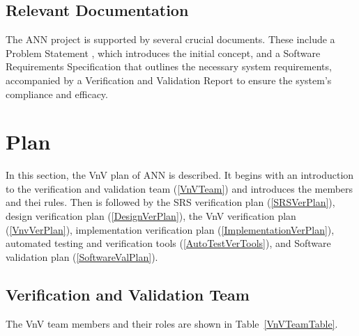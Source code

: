\documentclass[12pt, titlepage]{article}
\begin{document}
\subsection{Relevant Documentation}

The ANN project is supported by several crucial documents. 
These include a
Problem Statement \cite{ProblemStatement}, which introduces the initial concept, and a 
Software Requirements Specification \cite{SRS} that outlines the necessary system requirements, accompanied 
by a Verification and Validation Report \cite{VnVReport} to ensure the system's compliance and efficacy.




\section{Plan}\label{Plan}

In this section, the VnV plan of ANN is described. 
It begins with an introduction to the verification and validation team (\autoref{VnVTeam}) and 
introduces the members and thei rules. 
Then is followed by the SRS verification plan (\autoref{SRSVerPlan}), 
design verification plan (\autoref{DesignVerPlan}), 
the VnV verification plan (\autoref{VnvVerPlan}), 
implementation verification plan (\autoref{ImplementationVerPlan}), 
automated testing and verification tools (\autoref{AutoTestVerTools}), and
Software validation plan (\autoref{SoftwareValPlan}).


\subsection{Verification and Validation Team}\label{VnVTeam}

The VnV team members and their roles are shown in Table~\ref{VnVTeamTable}.
\end{document}
